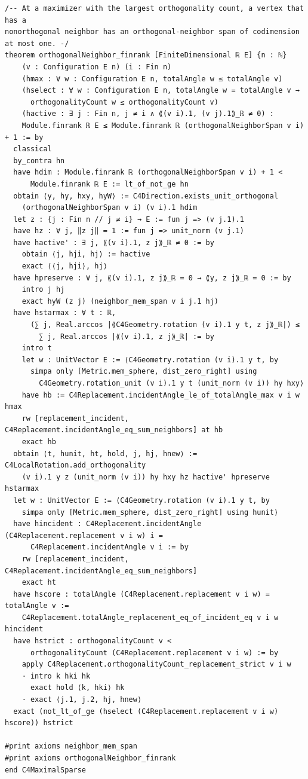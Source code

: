 \documentclass[11pt,a4paper]{article}
\begin{document}
\begin{Verbatim}[breaklines,breakanywhere,fontsize=\footnotesize]
/-- At a maximizer with the largest orthogonality count, a vertex that has a
nonorthogonal neighbor has an orthogonal-neighbor span of codimension at most one. -/
theorem orthogonalNeighbor_finrank [FiniteDimensional ℝ E] {n : ℕ}
    (v : Configuration E n) (i : Fin n)
    (hmax : ∀ w : Configuration E n, totalAngle w ≤ totalAngle v)
    (hselect : ∀ w : Configuration E n, totalAngle w = totalAngle v →
      orthogonalityCount w ≤ orthogonalityCount v)
    (hactive : ∃ j : Fin n, j ≠ i ∧ ⟪(v i).1, (v j).1⟫_ℝ ≠ 0) :
    Module.finrank ℝ E ≤ Module.finrank ℝ (orthogonalNeighborSpan v i) + 1 := by
  classical
  by_contra hn
  have hdim : Module.finrank ℝ (orthogonalNeighborSpan v i) + 1 <
      Module.finrank ℝ E := lt_of_not_ge hn
  obtain ⟨y, hy, hxy, hyW⟩ := C4Direction.exists_unit_orthogonal
    (orthogonalNeighborSpan v i) (v i).1 hdim
  let z : {j : Fin n // j ≠ i} → E := fun j => (v j.1).1
  have hz : ∀ j, ‖z j‖ = 1 := fun j => unit_norm (v j.1)
  have hactive' : ∃ j, ⟪(v i).1, z j⟫_ℝ ≠ 0 := by
    obtain ⟨j, hji, hj⟩ := hactive
    exact ⟨⟨j, hji⟩, hj⟩
  have hpreserve : ∀ j, ⟪(v i).1, z j⟫_ℝ = 0 → ⟪y, z j⟫_ℝ = 0 := by
    intro j hj
    exact hyW (z j) (neighbor_mem_span v i j.1 hj)
  have hstarmax : ∀ t : ℝ,
      (∑ j, Real.arccos |⟪C4Geometry.rotation (v i).1 y t, z j⟫_ℝ|) ≤
        ∑ j, Real.arccos |⟪(v i).1, z j⟫_ℝ| := by
    intro t
    let w : UnitVector E := ⟨C4Geometry.rotation (v i).1 y t, by
      simpa only [Metric.mem_sphere, dist_zero_right] using
        C4Geometry.rotation_unit (v i).1 y t (unit_norm (v i)) hy hxy⟩
    have hb := C4Replacement.incidentAngle_le_of_totalAngle_max v i w hmax
    rw [replacement_incident, C4Replacement.incidentAngle_eq_sum_neighbors] at hb
    exact hb
  obtain ⟨t, hunit, ht, hold, j, hj, hnew⟩ := C4LocalRotation.add_orthogonality
    (v i).1 y z (unit_norm (v i)) hy hxy hz hactive' hpreserve hstarmax
  let w : UnitVector E := ⟨C4Geometry.rotation (v i).1 y t, by
    simpa only [Metric.mem_sphere, dist_zero_right] using hunit⟩
  have hincident : C4Replacement.incidentAngle (C4Replacement.replacement v i w) i =
      C4Replacement.incidentAngle v i := by
    rw [replacement_incident, C4Replacement.incidentAngle_eq_sum_neighbors]
    exact ht
  have hscore : totalAngle (C4Replacement.replacement v i w) = totalAngle v :=
    C4Replacement.totalAngle_replacement_eq_of_incident_eq v i w hincident
  have hstrict : orthogonalityCount v <
      orthogonalityCount (C4Replacement.replacement v i w) := by
    apply C4Replacement.orthogonalityCount_replacement_strict v i w
    · intro k hki hk
      exact hold ⟨k, hki⟩ hk
    · exact ⟨j.1, j.2, hj, hnew⟩
  exact (not_lt_of_ge (hselect (C4Replacement.replacement v i w) hscore)) hstrict

#print axioms neighbor_mem_span
#print axioms orthogonalNeighbor_finrank
end C4MaximalSparse
\end{Verbatim}
\end{document}

